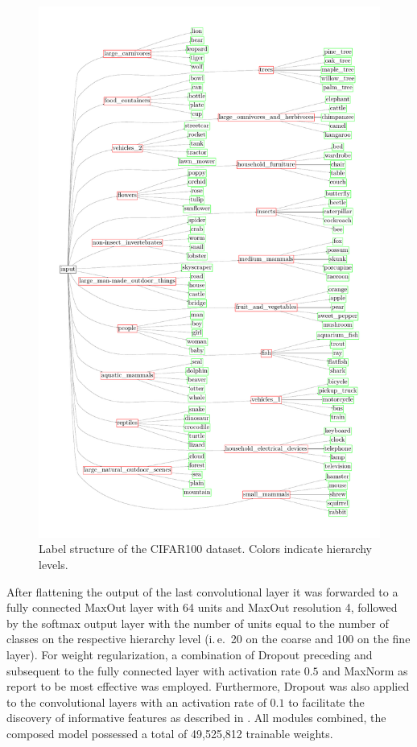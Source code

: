 \begin{figure}[htb]
    \centering
	    \includegraphics[width=\textwidth]{thesis/graphics/diagrams/cifar100_label_structure.pdf}
    \caption{Label structure of the CIFAR100 dataset. Colors indicate hierarchy levels.}
    \label{fig:experiments_cifar100_label_structure}
\end{figure}

\clearpage

After flattening the output of the last convolutional layer it was forwarded to a fully connected MaxOut layer with 64 units and MaxOut resolution 4, followed by the softmax output layer with the number of units equal to the number of classes on the respective hierarchy level (i.\,e.\ 20 on the coarse and 100 on the fine layer). For weight regularization, a combination of Dropout preceding and subsequent to the fully connected layer with activation rate $0.5$ and MaxNorm as \cite{Srivastava2014-pi} report to be most effective was employed. Furthermore, Dropout was also applied to the convolutional layers with an activation rate of $0.1$ to facilitate the discovery of informative features as described in \cite{Park2017-og}. All modules combined, the composed model possessed a total of 49,525,812 trainable weights.

